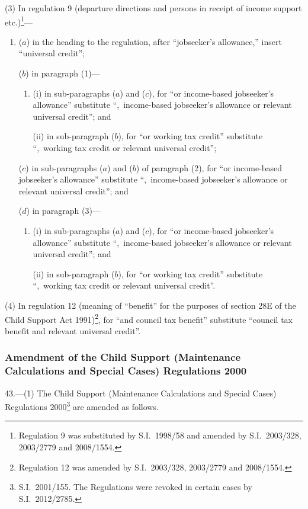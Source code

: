 \documentclass[12pt,a4paper]{article}
\begin{document}
(3) In regulation 9 (departure directions and persons in receipt of income support etc.)\footnote{Regulation 9 was substituted by S.I.~1998/58 and amended by S.I.~2003/328, 2003/2779 and 2008/1554.}—
\begin{enumerate}\item[]
($a$) in the heading to the regulation, after “jobseeker’s allowance,” insert “universal credit”;

($b$) in paragraph (1)—
\begin{enumerate}\item[]
(i) in sub-paragraphs ($a$)  and ($c$), for “or income-based jobseeker’s allowance” substitute “,~income-based jobseeker’s allowance or relevant universal credit”; and

(ii) in sub-paragraph ($b$), for “or working tax credit” substitute “,~working tax credit or relevant universal credit”;
\end{enumerate}

($c$) in sub-paragraphs ($a$)  and ($b$)  of paragraph (2), for “or income-based jobseeker’s allowance” substitute “,~income-based jobseeker’s allowance or relevant universal credit”; and

($d$) in paragraph (3)—
\begin{enumerate}\item[]
(i) in sub-paragraphs ($a$)  and ($c$), for “or income-based jobseeker’s allowance” substitute “,~income-based jobseeker’s allowance or relevant universal credit”; and

(ii) in sub-paragraph ($b$), for “or working tax credit” substitute “,~working tax credit or relevant universal credit”.
\end{enumerate}
\end{enumerate}

(4) In regulation 12 (meaning of “benefit” for the purposes of section 28E of the Child Support Act 1991)\footnote{Regulation 12 was amended by S.I.~2003/328, 2003/2779 and 2008/1554.}, for “and council tax benefit” substitute “council tax benefit and relevant universal credit”.

\subsubsection[43. Amendment of the Child Support (Maintenance Calculations and Special Cases) Regulations 2000]{Amendment of the Child Support (Maintenance Calculations and Special Cases) Regulations 2000}

43.—(1) The Child Support (Maintenance Calculations and Special Cases) Regulations 2000\footnote{S.I.~2001\slash 155. The Regulations were revoked in certain cases by S.I.~2012/2785.} are amended as follows.
\end{document}
